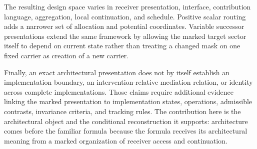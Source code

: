 The resulting design space varies in receiver presentation, interface, contribution language, aggregation, local continuation, and schedule. Positive scalar routing adds a narrower set of allocation and potential coordinates. Variable successor presentations extend the same framework by allowing the marked target sector itself to depend on current state rather than treating a changed mask on one fixed carrier as creation of a new carrier.

Finally, an exact architectural presentation does not by itself establish an implementation boundary, an intervention-relative mediation relation, or identity across complete implementations. Those claims require additional evidence linking the marked presentation to implementation states, operations, admissible contrasts, invariance criteria, and tracking rules. The contribution here is the architectural object and the conditional reconstruction it supports: architecture comes before the familiar formula because the formula receives its architectural meaning from a marked organization of receiver access and continuation.
